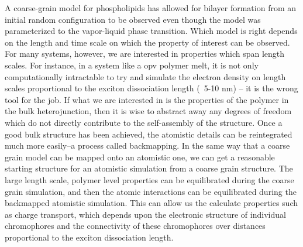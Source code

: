 A coarse-grain model for phospholipids has allowed for bilayer formation from an initial random configuration to be observed even though the model was parameterized to the vapor-liquid phase transition\cite{Shelley2001}.
Which model is right depends on the length and time scale on which the property of interest can be observed.
For many systems, however, we are interested in properties which span length scales.
For instance, in a system like a opv polymer melt, it is not only computationally intractable to try and simulate the electron density on length scales proportional to the exciton dissociation length (~5-10 nm)\cite{Huang2010} -- it is the wrong tool for the job.
If what we are interested in is the properties of the polymer in the bulk heterojunction, then it is wise to abstract away any degrees of freedom which do not directly contribute to the self-assembly of the structure.
Once a good bulk structure has been achieved, the atomistic details can be reintegrated much more easily--a process called backmapping.
In the same way that a coarse grain model can be mapped onto an atomistic one, we can get a reasonable starting structure for an atomistic simulation from a coarse grain structure.
The large length scale, polymer level properties can be equilibrated during the coarse grain simulation, and then the atomic interactions can be equilibrated during the backmapped atomistic simulation.
This can allow us the calculate properties such as charge transport, which depends upon the electronic structure of individual chromophores and the connectivity of these chromophores over distances proportional to the exciton dissociation length.


